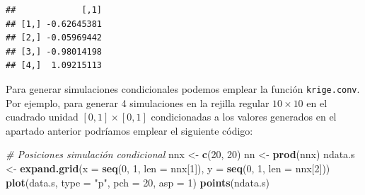 \documentclass[]{book}
\newenvironment{Shaded}{\begin{snugshade}}{\end{snugshade}}
\newcommand{\KeywordTok}[1]{\textcolor[rgb]{0.13,0.29,0.53}{\textbf{#1}}}
\newcommand{\DataTypeTok}[1]{\textcolor[rgb]{0.13,0.29,0.53}{#1}}
\newcommand{\DecValTok}[1]{\textcolor[rgb]{0.00,0.00,0.81}{#1}}
\newcommand{\StringTok}[1]{\textcolor[rgb]{0.31,0.60,0.02}{#1}}
\newcommand{\CommentTok}[1]{\textcolor[rgb]{0.56,0.35,0.01}{\textit{#1}}}
\newcommand{\ControlFlowTok}[1]{\textcolor[rgb]{0.13,0.29,0.53}{\textbf{#1}}}
\newcommand{\OperatorTok}[1]{\textcolor[rgb]{0.81,0.36,0.00}{\textbf{#1}}}
\newcommand{\NormalTok}[1]{#1}
\theoremstyle{definition}
\theoremstyle{definition}
\theoremstyle{definition}
\theoremstyle{remark}
\begin{document}
\begin{Shaded}
\end{Shaded}

\begin{verbatim}
##             [,1]
## [1,] -0.62645381
## [2,] -0.05969442
## [3,] -0.98014198
## [4,]  1.09215113
\end{verbatim}

Para generar simulaciones condicionales podemos emplear la función
\texttt{krige.conv}. Por ejemplo, para generar 4 simulaciones en la
rejilla regular \(10\times10\) en el cuadrado unidad
\([0,1] \times [0,1]\) condicionadas a los valores generados en el
apartado anterior podríamos emplear el siguiente código:

\begin{Shaded}
\begin{Highlighting}[]
\CommentTok{# Posiciones simulación condicional}
\NormalTok{nnx <-}\StringTok{ }\KeywordTok{c}\NormalTok{(}\DecValTok{20}\NormalTok{, }\DecValTok{20}\NormalTok{)}
\NormalTok{nn <-}\StringTok{ }\KeywordTok{prod}\NormalTok{(nnx)}
\NormalTok{ndata.s <-}\StringTok{ }\KeywordTok{expand.grid}\NormalTok{(}\DataTypeTok{x =} \KeywordTok{seq}\NormalTok{(}\DecValTok{0}\NormalTok{, }\DecValTok{1}\NormalTok{, }\DataTypeTok{len =}\NormalTok{ nnx[}\DecValTok{1}\NormalTok{]), }\DataTypeTok{y =} \KeywordTok{seq}\NormalTok{(}\DecValTok{0}\NormalTok{, }\DecValTok{1}\NormalTok{, }\DataTypeTok{len =}\NormalTok{ nnx[}\DecValTok{2}\NormalTok{]))}
\KeywordTok{plot}\NormalTok{(data.s, }\DataTypeTok{type =} \StringTok{"p"}\NormalTok{, }\DataTypeTok{pch =} \DecValTok{20}\NormalTok{, }\DataTypeTok{asp =} \DecValTok{1}\NormalTok{)}
\KeywordTok{points}\NormalTok{(ndata.s)}
\end{Highlighting}
\end{Shaded}
\end{document}
